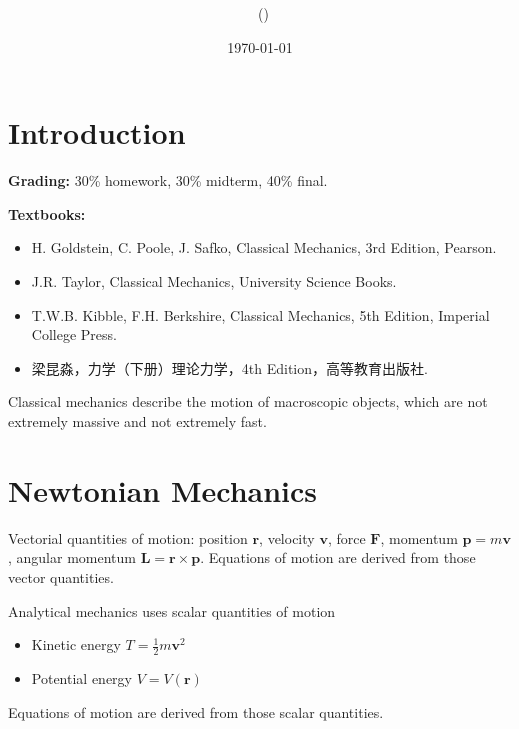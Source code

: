 \documentclass[twoside,11pt]{article}
\title{{\lms \Code \ \Ass}}
\author{\lms \name \ (\href{mailto:\mail}{\mail})}
\date{\lms \today}
\makeatletter
\numberwithin{equation}{section} %
\newcommand{\lms}{\fontfamily{lmss}\selectfont} %
\theoremstyle{definition}
\theoremstyle{remark}
\newtheorem*{remark}{\lms Remark}
\renewcommand{\maketitle}{\bgroup\setlength{\parindent}{0pt}
\begin{flushleft}
  \textbf{\Large\@title}

  \@author
\end{flushleft}\egroup
}
\makeatother
\begin{document}
\maketitle
\thispagestyle{title}



\setcounter{section}{-1}
\section{Introduction}
\textbf{Grading:} 30\% homework, 30\% midterm, 40\% final.

\textbf{Textbooks:}
\begin{itemize}
    \item H. Goldstein, C. Poole, J. Safko, Classical Mechanics,
    3rd Edition, Pearson.
    \item J.R. Taylor, Classical Mechanics, University Science Books.
    \item T.W.B. Kibble, F.H. Berkshire, Classical Mechanics, 5th Edition,
    Imperial College Press.
    \item 梁昆淼，力学（下册）理论力学，4th Edition，高等教育出版社.
\end{itemize}

Classical mechanics describe the motion of macroscopic objects, which are
not extremely massive and not extremely fast.

\section{Newtonian Mechanics}
Vectorial quantities of motion: position $\mathbf{r}$, 
velocity $\mathbf{v}$, force $\mathbf{F}$,
momentum $\mathbf{p}=m\mathbf{v}$,
angular momentum $\mathbf{L}=\mathbf{r}\times\mathbf{p}$.
Equations of motion are derived from those vector quantities.

Analytical mechanics uses scalar quantities of motion
\begin{itemize}
    \item Kinetic energy $T = \frac{1}{2}m\mathbf{v}^2$
    \item Potential energy $V = V(\mathbf{r})$
\end{itemize}
Equations of motion are derived from those scalar quantities.
\end{document}
